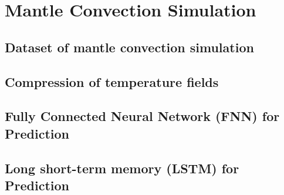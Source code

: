 \chapter{Mantle Convection Simulation}\label{chap:evaluation}

\section{Dataset of mantle convection simulation}


\section{Compression of temperature fields}


\section{Fully Connected Neural Network (FNN) for Prediction}


\section{Long short-term memory (LSTM) for Prediction}
